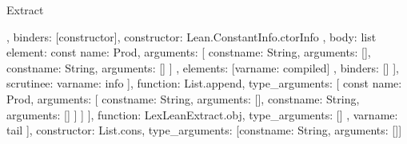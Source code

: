 \begin{lexlean}{Extract}
\begin{toolingmodule}
{{{{{{{{{{{{{{{{{{                                                      },
                                                      binders: [constructor],
                                                      constructor: Lean.ConstantInfo.ctorInfo
                                                    },
                                                    {
                                                      body: list{
                                                        element: const{
                                                          name: Prod,
                                                          arguments: [
                                                            const{name: String, arguments: []},
                                                            const{name: String, arguments: []}
                                                          ]
                                                        },
                                                        elements: [var{name: compiled}]
                                                      },
                                                      binders: []
                                                    }
                                                  ],
                                                  scrutinee: var{name: info}
                                                }
                                              ],
                                              function: List.append,
                                              type_arguments: [
                                                const{
                                                  name: Prod,
                                                  arguments: [
                                                    const{name: String, arguments: []},
                                                    const{name: String, arguments: []}
                                                  ]
                                                }
                                              ]
                                            }
                                          ],
                                          function: LexLeanExtract.obj,
                                          type_arguments: []
                                        },
                                        var{name: tail}
                                      ],
                                      constructor: List.cons,
                                      type_arguments: [const{name: String, arguments: []}]
                                    }
}}}}}}}}}}}}
\end{toolingmodule}
\end{lexlean}
